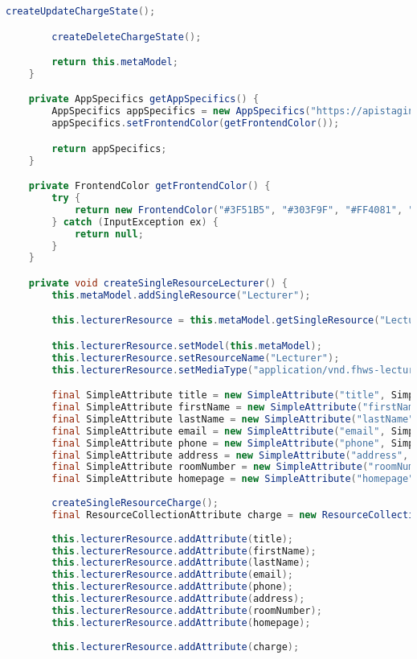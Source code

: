 \begin{lstlisting}[label=lst:enfield_model,
language=java,
firstnumber=1,
caption=Beschreibung des \textit{Enfield-Modell} der Referenzimplementierung. ]
		createUpdateChargeState();

		createDeleteChargeState();

		return this.metaModel;
	}

	private AppSpecifics getAppSpecifics() {
		AppSpecifics appSpecifics = new AppSpecifics("https://apistaging.fiw.fhws.de/mig/api/");
		appSpecifics.setFrontendColor(getFrontendColor());

		return appSpecifics;
	}

	private FrontendColor getFrontendColor() {
		try {
			return new FrontendColor("#3F51B5", "#303F9F", "#FF4081", "#fff");
		} catch (InputException ex) {
			return null;
		}
	}

	private void createSingleResourceLecturer() {
		this.metaModel.addSingleResource("Lecturer");

		this.lecturerResource = this.metaModel.getSingleResource("Lecturer");

		this.lecturerResource.setModel(this.metaModel);
		this.lecturerResource.setResourceName("Lecturer");
		this.lecturerResource.setMediaType("application/vnd.fhws-lecturer.default+json");

		final SimpleAttribute title = new SimpleAttribute("title", SimpleDatatype.STRING);
		final SimpleAttribute firstName = new SimpleAttribute("firstName", SimpleDatatype.STRING);
		final SimpleAttribute lastName = new SimpleAttribute("lastName", SimpleDatatype.STRING);
		final SimpleAttribute email = new SimpleAttribute("email", SimpleDatatype.STRING);
		final SimpleAttribute phone = new SimpleAttribute("phone", SimpleDatatype.STRING);
		final SimpleAttribute address = new SimpleAttribute("address", SimpleDatatype.STRING);
		final SimpleAttribute roomNumber = new SimpleAttribute("roomNumber", SimpleDatatype.STRING);
		final SimpleAttribute homepage = new SimpleAttribute("homepage", SimpleDatatype.LINK);
		
		createSingleResourceCharge();
		final ResourceCollectionAttribute charge = new ResourceCollectionAttribute("chargeUrl", this.chargeResource);
	
		this.lecturerResource.addAttribute(title);
		this.lecturerResource.addAttribute(firstName);
		this.lecturerResource.addAttribute(lastName);
		this.lecturerResource.addAttribute(email);
		this.lecturerResource.addAttribute(phone);
		this.lecturerResource.addAttribute(address);
		this.lecturerResource.addAttribute(roomNumber);
		this.lecturerResource.addAttribute(homepage);
		
		this.lecturerResource.addAttribute(charge);
		

\end{lstlisting}
